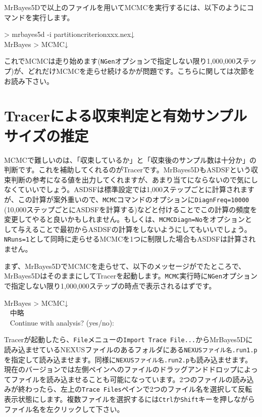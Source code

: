 \documentclass[titlepage,10pt,a4paper]{jsbook}
\newenvironment{cmd}{\begin{oframed}\raggedright\ttfamily\footnotesize\setlength{\baselineskip}{1.4em}}{\end{oframed}\vspace{-1em}}
\begin{document}
MrBayes5Dで以上のファイルを用いてMCMCを実行するには、以下のようにコマンドを実行します。
\begin{cmd}
{\textgreater} mrbayes5d -i partition{\textunderscore}criterion{\textunderscore}xxx.nex↓\\
MrBayes {\textgreater} MCMC↓
\end{cmd}
これでMCMCは走り始めます(\texttt{NGen}オプションで指定しない限り1,000,000ステップ)が、どれだけMCMCを走らせ続けるかが問題です。こちらに関しては次節をお読み下さい。

\section{Tracerによる収束判定と有効サンプルサイズの推定}\label{section:Tracer}

MCMCで難しいのは、「収束しているか」と「収束後のサンプル数は十分か」の判断です。これを補助してくれるのがTracerです。MrBayes5DもASDSFという収束判断の参考になる値を出力してくれますが、あまり当てにならないので気にしなくていいでしょう。ASDSFは標準設定では1,000ステップごとに計算されますが、この計算が案外重いので、\texttt{MCMC}コマンドのオプションに\texttt{DiagnFreq=10000} (10,000ステップごとにASDSFを計算する)などと付けることでこの計算の頻度を変更してやると良いかもしれません。もしくは、\texttt{MCMCDiagn=No}をオプションとして与えることで最初からASDSFの計算をしないようにしてもいいでしょう。\texttt{NRuns=1}として同時に走らせるMCMCを1つに制限した場合もASDSFは計算されません。

まず、MrBayes5DでMCMCを走らせて、以下のメッセージがでたところで、MrBayes5DはそのままにしてTracerを起動します。\texttt{MCMC}実行時に\texttt{NGen}オプションで指定しない限り1,000,000ステップの時点で表示されるはずです。
\begin{cmd}
MrBayes {\textgreater} MCMC↓\\
~ 中略\\
~ Continue with analysis? (yes/no):
\end{cmd}
Tracerが起動したら、\texttt{File}メニューの\texttt{Import Trace File...}からMrBayes5Dに読み込ませているNEXUSファイルのあるフォルダにある\texttt{NEXUSファイル名.run1.p}を指定して読み込ませます。同様に\texttt{NEXUSファイル名.run2.p}も読み込ませます。現在のバージョンでは左側ペインへのファイルのドラッグアンドドロップによってファイルを読み込ませることも可能になっています。2つのファイルの読み込みが終わったら、左上の\texttt{Trace Files}ペインで2つのファイル名を選択して反転表示状態にします。複数ファイルを選択するには\texttt{Ctrl}か\texttt{Shift}キーを押しながらファイル名を左クリックして下さい。
\end{document}
